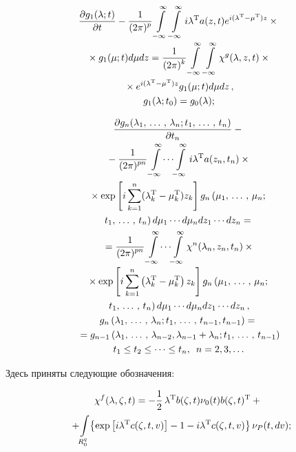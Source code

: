 \begin{multicols}{2}

\noindent
\begin{multline} %
\fr{\prt g_1 (\la;t)}{\prt t} -
\fr{1}{(2\pi)^p} \iin \iin i\la^{\mathrm{T}} a (z,t) e^{i(\la^{\mathrm{T}} -\mu^{\mathrm{T}})z} \times{}\\[-2pt]
{}\times g_1 (\mu;t) d\mu dz=
\fr{1}{(2\pi)^k} \iin \iin \chi^g(\la, z,t)\times{}\\[-1pt]
{}\times  e^{i(\la^{\mathrm{T}} -\mu^{\mathrm{T}})z} g_1 (\mu;t) d\mu dz\,, %
\\
g_1(\la;t_0) = g_0(\la);\label{e3.8-s}
\end{multline}

\vspace*{-14pt}

\noindent
\begin{multline*}
 \fr{\prt g_n (\la_1\tr \la_n; t_1\tr t_n)}{\prt t_n} -{}\\[-2pt]
 {}-\fr{1}{(2\pi)^{pn}} \iin \!\cdots \!\iin i\la^{\mathrm{T}} a (z_n,t_n) \times{}\\
{}\times \exp \lk i \sss_{k=1}^n (\la_k^{\mathrm{T}} - \mu_k^{\mathrm{T}}) z_k\rk g_n \left(\mu_1\tr \mu_n;\right.\\
\left. t_1\tr t_n\right) d\mu_1 \cdots d \mu_n dz_1\cdots dz_n={}\\
{}=\fr{1}{(2\pi)^{pn}} \iin\!\cdots\! \iin \chi^n (\la_n, z_n,t_n)\times{}\\[-2pt]
{}\times\exp \lk i \sss_{k=1}^n \left(\la_k^{\mathrm{T}} - \mu_k^{\mathrm{T}}\right) z_k\rk g_n 
\left(\mu_1\tr \mu_n;\right.\\
\left. t_1\tr t_n\right) d\mu_1 \cdots d \mu_n dz_1\cdots dz_n\,, %
\\
g_n \left(\la_1\tr \la_n; t_1\tr t_{n-1},t_{n-1}\right)={}\\
{}= g_{n-1} \left(\la_1\tr \la_{n-2},\la_{n-1}+\la_n; t_1\tr t_{n-1}\right)\\
t_1\le t_2 \le\cdots \le t_n, \enskip n=2,3,\ldots
\end{multline*}

\vspace*{-1pt}

\noindent
Здесь приняты следующие обозначения:

\vspace*{-9pt}

    \begin{multline*}
    \chi^f (\lambda,\zeta, t) =-\displaystyle\frac{\displaystyle 1\mathstrut}{\displaystyle 2\mathstrut}\, \lambda^{\mathrm{T}} b(\zeta,t) \nu_0(t) b(\zeta,t)^{\mathrm{T}} +{}\\[-1pt]
{}+\! \int\limits_{R_0^q}\! \left\{ \exp \left[ i\lambda^{\mathrm{T}} c(\zeta,t,v) \right] -1 -i\lambda^{\mathrm{T}} c(\zeta, t,v)\right\} \nu_P (t,dv);\hspace*{-4.47359pt}
\end{multline*}


\end{multicols}
